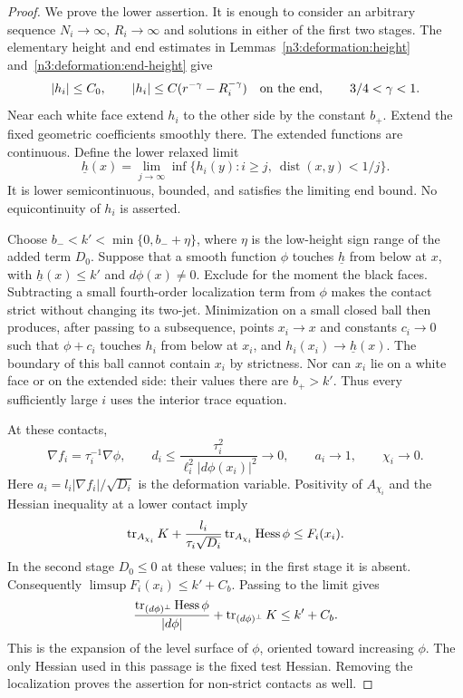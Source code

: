 \begin{proof}
We prove the lower assertion.  It is enough to consider an arbitrary
sequence $N_i\to\infty$, $R_i\to\infty$ and solutions in either of the
first two stages.  The elementary height and end estimates in
Lemmas~\ref{n3:deformation:height} and~\ref{n3:deformation:end-height} give
\begin{equation}
 |h_i|\le C_0,\qquad
 |h_i|\le C(r^{-\gamma}-R_i^{-\gamma})\quad\hbox{on the end},
 \qquad 3/4<\gamma<1.
 \label{n3:apriori:elementary-height}
\end{equation}
Near each white face extend $h_i$ to the other side by the constant
$b_+$.  Extend the fixed geometric coefficients smoothly there.
The extended functions are continuous.  Define the lower relaxed limit
\[
 \underline h(x)=\lim_{j\to\infty}
       \inf\{h_i(y):i\ge j,\ \operatorname{dist}(x,y)<1/j\}.
\]
It is lower semicontinuous, bounded, and satisfies the limiting end
bound.  No equicontinuity of $h_i$ is asserted.

Choose $b_-<k'<\min\{0,b_-+\eta\}$, where $\eta$ is the low-height
sign range of the added term $D_0$.  Suppose that a smooth function
$\phi$ touches $\underline h$ from below at $x$, with
$\underline h(x)\le k'$ and $d\phi(x)\ne0$.  Exclude for the moment
the black faces.  Subtracting a small fourth-order localization term
from $\phi$ makes the contact strict without changing its two-jet.
Minimization on a small closed ball then produces, after passing to a
subsequence, points $x_i\to x$ and constants $c_i\to0$ such that
$\phi+c_i$ touches $h_i$ from below
at $x_i$, and $h_i(x_i)\to\underline h(x)$.  The boundary of this
ball cannot contain $x_i$ by strictness.  Nor can $x_i$ lie on a white
face or on the extended side: their values there are $b_+>k'$.
Thus every sufficiently large $i$ uses the interior trace equation.

At these contacts,
\[
 \nabla f_i=\tau_i^{-1}\nabla\phi,
 \qquad
 d_i\le\frac{\tau_i^2}{\ell_i^2|d\phi(x_i)|^2}
          \longrightarrow0,
 \qquad a_i\longrightarrow1,
 \qquad \chi_i\longrightarrow0.
\]
Here $a_i=l_i|\nabla f_i|/\sqrt{D_i}$ is the deformation variable.
Positivity of $A_{\chi_i}$ and the Hessian
inequality at a lower contact imply
\[
 \operatorname{tr}_{A_{\chi_i}}K+
 \frac{l_i}{\tau_i\sqrt{D_i}}
                 \operatorname{tr}_{A_{\chi_i}}\operatorname{Hess}\phi
 \le F_i(x_i).
\]
In the second stage $D_0\le0$ at these values; in the first stage it
is absent.  Consequently $\limsup F_i(x_i)\le k'+C_b$.
Passing to the limit gives
\begin{equation}
 \frac{\operatorname{tr}_{(d\phi)^\perp}\operatorname{Hess}\phi}{|d\phi|}
           +\operatorname{tr}_{(d\phi)^\perp}K\le k'+C_b.
 \label{n3:apriori:relaxed-test}
\end{equation}
This is the expansion of the level surface of $\phi$, oriented toward
increasing $\phi$.  The only Hessian used in this passage is the
fixed test Hessian.  Removing the localization proves the assertion
for non-strict contacts as well.


\end{proof}
